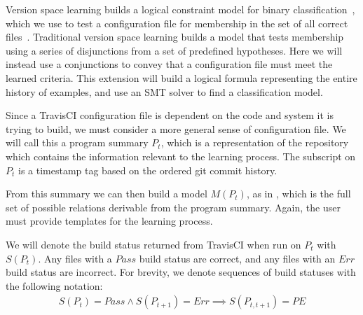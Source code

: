 Version space learning builds a logical constraint model for binary
classification~\cite{mitchell77}, which we use to test a configuration file for membership
in the set of all correct files~.
Traditional version space learning builds a model that tests membership
using a series of disjunctions from a set of predefined hypotheses.
Here we will instead use a conjunctions to convey that a configuration file must meet the learned criteria.
This extension will build a logical formula representing the entire 
history of examples, and use an SMT solver to find a classification model.

Since a TravisCI configuration file is dependent
on the code and system it is trying to build, 
we must consider a more general sense of configuration file.
We will call this a program summary $P_t$, which is a representation 
of the repository which contains the information 
relevant to the learning process.
The subscript on $P_t$ is a timestamp tag based on 
the ordered git commit history.


From this summary we can then build a model $M(P_t)$, as in \app,
which is the full set of possible relations derivable 
from the program summary.
Again, the user must provide templates for the learning process.

We will denote the build status returned from TravisCI when run on $P_t$ with $S(P_t)$.
Any files with a $Pass$ build status are correct, and any files with an $Err$ build status are incorrect.
For brevity, we denote sequences of build statuses with the following notation:
\begin{align*}
  S(P_t)=Pass \land S(P_{t+1})=Err \implies S(P_{t,t+1}) = PE
\end{align*}

